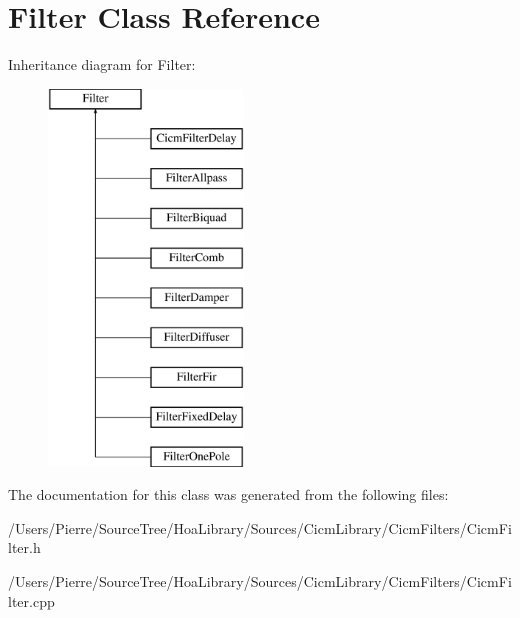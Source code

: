 \hypertarget{class_filter}{\section{Filter Class Reference}
\label{class_filter}
}
Inheritance diagram for Filter\-:\begin{figure}[H]
\begin{center}
\leavevmode
\includegraphics[height=10.000000cm]{class_filter}
\end{center}
\end{figure}


The documentation for this class was generated from the following files\-:\begin{DoxyCompactItemize}
\item 
/\-Users/\-Pierre/\-Source\-Tree/\-Hoa\-Library/\-Sources/\-Cicm\-Library/\-Cicm\-Filters/Cicm\-Filter.\-h\item 
/\-Users/\-Pierre/\-Source\-Tree/\-Hoa\-Library/\-Sources/\-Cicm\-Library/\-Cicm\-Filters/Cicm\-Filter.\-cpp\end{DoxyCompactItemize}
